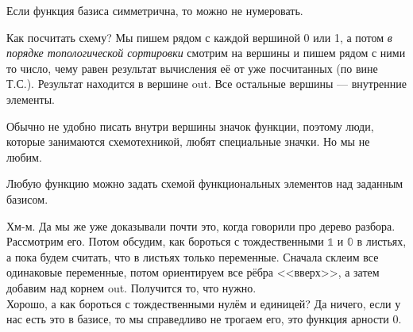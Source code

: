 \documentclass{article}
\begin{document}
\begin{itemize}
        \begin{Comment}
            Если функция базиса симметрична, то можно не нумеровать.
        \end{Comment}
        \begin{Comment}
            Как посчитать схему? Мы пишем рядом с каждой вершиной 0 или 1, а потом \textit{в порядке топологической сортировки} смотрим на вершины и пишем рядом с ними то число, чему равен результат вычисления её от уже посчитанных (по вине Т.С.). Результат находится в вершине out. Все остальные вершины --- внутренние элементы.
        \end{Comment}
        \begin{Comment}
            Обычно не удобно писать внутри вершины значок функции, поэтому люди, которые занимаются схемотехникой, любят специальные значки. Но мы не любим.
        \end{Comment}
        \thm Любую функцию можно задать схемой функциональных элементов над заданным базисом.
        \begin{Proof}
            Хм-м. Да мы же уже доказывали почти это, когда говорили про дерево разбора. Рассмотрим его. Потом обсудим, как бороться с тождественными $\mathbb1$ и $\mathbb0$ в листьях, а пока будем считать, что в листьях только переменные. Сначала склеим все одинаковые переменные, потом ориентируем все рёбра <<вверх>>, а затем добавим над корнем out. Получится то, что нужно.\\
            Хорошо, а как бороться с тождественными нулём и единицей? Да ничего, если у нас есть это в базисе, то мы справедливо не трогаем его, это функция арности 0.\\
\end{Proof}
\end{itemize}
\end{document}

